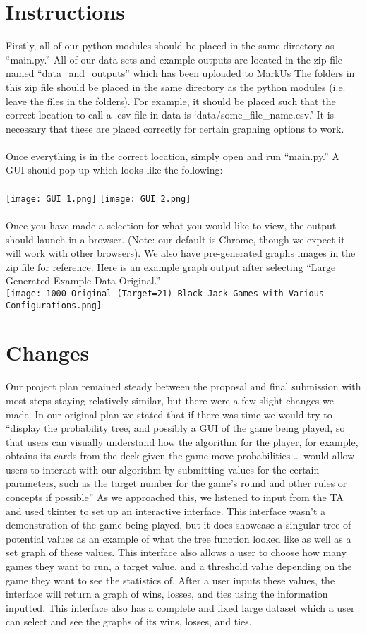 \documentclass[fontsize=11pt]{article}
\begin{document}
\section*{Instructions}
Firstly, all of our python modules should be placed in the same directory as “main.py.” All of our data sets and example outputs are located in the zip file named “data\_and\_outputs” which has been uploaded to MarkUs The folders in this zip file should be placed in the same directory as the python modules (i.e. leave the files in the folders). For example, it should be placed such that the correct location to call a .csv file in data is ‘data/some\_file\_name.csv.’ It is necessary that these are placed correctly for certain graphing options to work.
\\\\
Once everything is in the correct location, simply open and run “main.py.” A GUI should pop up which looks like the following:
\\\\
\texttt{[image: GUI 1.png]}
\texttt{[image: GUI 2.png]}
\\
\\
Once you have made a selection for what you would like to view, the output should launch in a browser. (Note: our default is Chrome, though we expect it will work with other browsers). We also have pre-generated graphs images in the zip file for reference. Here is an example graph output after selecting “Large Generated Example Data Original.”
\\
\texttt{[image: 1000 Original (Target=21) Black Jack Games with Various Configurations.png]}

\section*{Changes}
Our project plan remained steady between the proposal and final submission with most steps staying relatively similar, but there were a few slight changes we made. In our original plan we stated that if there was time we would try to “display the probability tree, and possibly a GUI of the game being played, so that users can visually understand how the algorithm for the player, for example, obtains its cards from the deck given the game move probabilities … would allow users to interact with our algorithm by submitting values for the certain parameters, such as the target number for the game’s round and other rules or concepts if possible” As we approached this, we listened to input from the TA and used tkinter to set up an interactive interface. This interface wasn't a demonstration of the game being played, but it does showcase a singular tree of potential values as an example of what the tree function looked like as well as a set graph of these values. This interface also allows a user to choose how many games they want to run, a target value, and a threshold value depending on the game they want to see the statistics of. After a user inputs these values, the interface will return a graph of wins, losses, and ties using the information inputted. This interface also has a complete and fixed large dataset which a user can select and see the graphs of its wins, losses, and ties.
\end{document}

